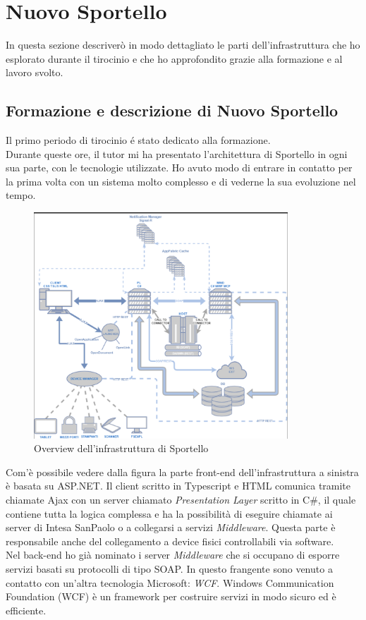\section{Nuovo Sportello}

In questa sezione descriverò in modo dettagliato le parti dell'infrastruttura che ho esplorato durante il tirocinio e che ho approfondito grazie alla formazione e al lavoro svolto.

\subsection{Formazione e descrizione di Nuovo Sportello}

Il primo periodo di tirocinio é stato dedicato alla formazione. \\ 
Durante queste ore, il tutor \NST mi ha presentato l'architettura di Sportello in ogni sua parte, con le tecnologie utilizzate. Ho avuto modo di entrare in contatto per la prima volta con un sistema molto complesso e di vederne la sua evoluzione nel tempo. \\

\begin{figure}[!ht]
    \centering
	\includegraphics[width=0.85\textwidth]{./res/img/infrastruttura sportello.png}
    \caption{Overview dell'infrastruttura di Sportello}
\end{figure}

Com'è possibile vedere dalla figura la parte front-end dell'infrastruttura a sinistra è basata su ASP.NET. Il client scritto in Typescript e HTML comunica tramite chiamate Ajax con un server chiamato \textit{Presentation Layer} scritto in C\#, il quale contiene tutta la logica complessa e ha la possibilità di eseguire chiamate ai server di Intesa SanPaolo o a collegarsi a servizi \textit{Middleware}. Questa parte è responsabile anche del collegamento a device fisici controllabili via software. \\
Nel back-end ho già nominato i server \textit{Middleware} che si occupano di esporre servizi basati su protocolli di tipo SOAP. In questo frangente sono venuto a contatto con un'altra tecnologia Microsoft: \textit{WCF}. Windows Communication Foundation (WCF) è un framework per costruire servizi in modo sicuro ed è efficiente. \\

